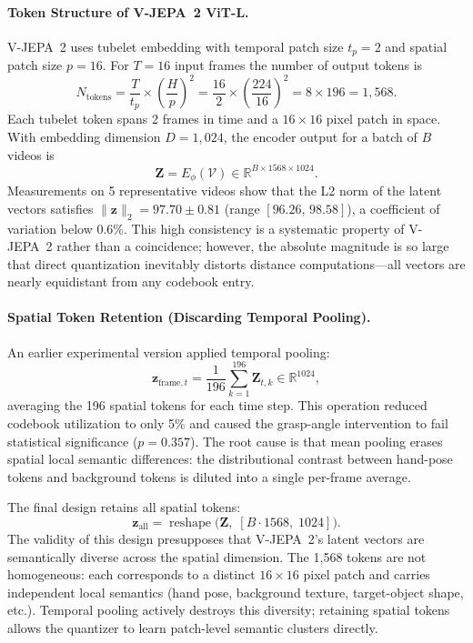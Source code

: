 \documentclass{article}
\begin{document}
\paragraph{Token Structure of V-JEPA~2 ViT-L.}
V-JEPA~2 uses tubelet embedding with temporal patch size $t_p = 2$ and spatial
patch size $p = 16$.  For $T = 16$ input frames the number of output tokens is
%
\begin{equation}
  N_{\text{tokens}}
  = \frac{T}{t_p} \times \left(\frac{H}{p}\right)^2
  = \frac{16}{2} \times \left(\frac{224}{16}\right)^2
  = 8 \times 196
  = 1{,}568.
\end{equation}
%
Each tubelet token spans 2 frames in time and a $16\times16$ pixel patch in
space.  With embedding dimension $D = 1{,}024$, the encoder output for a batch
of $B$ videos is
%
\begin{equation}
  \mathbf{Z} = E_\phi(\mathcal{V}) \in \mathbb{R}^{B \times 1568 \times 1024}.
\end{equation}
%
Measurements on 5 representative videos show that the L2 norm of the latent
vectors satisfies $\|\mathbf{z}\|_2 = 97.70 \pm 0.81$ (range
$[96.26,\,98.58]$), a coefficient of variation below $0.6\%$.  This high
consistency is a systematic property of V-JEPA~2 rather than a coincidence;
however, the absolute magnitude is so large that direct quantization inevitably
distorts distance computations---all vectors are nearly equidistant from any
codebook entry.

\paragraph{Spatial Token Retention (Discarding Temporal Pooling).}
An earlier experimental version applied temporal pooling:
%
\begin{equation}
  \mathbf{z}_{\text{frame},t}
  = \frac{1}{196}\sum_{k=1}^{196}\mathbf{Z}_{t,k}
  \in \mathbb{R}^{1024},
\end{equation}
%
averaging the 196 spatial tokens for each time step.  This operation reduced
codebook utilization to only 5\% and caused the grasp-angle intervention to
fail statistical significance ($p = 0.357$).  The root cause is that mean
pooling erases spatial local semantic differences: the distributional contrast
between hand-pose tokens and background tokens is diluted into a single
per-frame average.

The final design retains all spatial tokens:
%
\begin{equation}
  \mathbf{z}_{\text{all}}
  = \operatorname{reshape}\!\bigl(\mathbf{Z},\;
    [B \cdot 1568,\; 1024]\bigr).
\end{equation}
%
The validity of this design presupposes that V-JEPA~2's latent vectors are
semantically diverse across the spatial dimension.  The 1,568 tokens are not
homogeneous: each corresponds to a distinct $16\times16$ pixel patch and carries
independent local semantics (hand pose, background texture, target-object shape,
etc.).  Temporal pooling actively destroys this diversity; retaining spatial
tokens allows the quantizer to learn patch-level semantic clusters directly.
\end{document}

